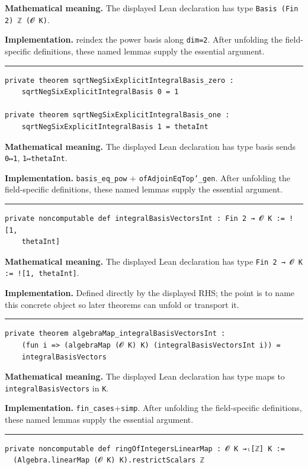 \documentclass[UTF8,a4paper,11pt,fontset=fandol]{ctexart}
\theoremstyle{definition}
\newcommand{\statementsep}{\par\medskip\hrule\medskip}
\begin{document}
\noindent\textbf{Mathematical meaning.} The displayed Lean declaration has type \texttt{Basis (Fin 2) ℤ (𝓞 K)}.\par
\noindent\textbf{Implementation.} reindex the power basis along \texttt{dim=2}. After unfolding the field-specific definitions, these named lemmas supply the essential argument.\par
\statementsep
\begin{verbatim}
private theorem sqrtNegSixExplicitIntegralBasis_zero :
    sqrtNegSixExplicitIntegralBasis 0 = 1

private theorem sqrtNegSixExplicitIntegralBasis_one :
    sqrtNegSixExplicitIntegralBasis 1 = thetaInt
\end{verbatim}
\noindent\textbf{Mathematical meaning.} The displayed Lean declaration has type basis sends \texttt{0↦1}, \texttt{1↦thetaInt}.\par
\noindent\textbf{Implementation.} \texttt{basis\_\allowbreak{}eq\_\allowbreak{}pow} + \texttt{ofAdjoinEqTop'\_\allowbreak{}gen}. After unfolding the field-specific definitions, these named lemmas supply the essential argument.\par
\statementsep
\begin{verbatim}
private noncomputable def integralBasisVectorsInt : Fin 2 → 𝓞 K := ![1,
    thetaInt]
\end{verbatim}
\noindent\textbf{Mathematical meaning.} The displayed Lean declaration has type \texttt{Fin 2 → 𝓞 K := ![1, thetaInt]}.\par
\noindent\textbf{Implementation.} Defined directly by the displayed RHS; the point is to name this concrete object so later theorems can unfold or transport it.\par
\statementsep
\begin{verbatim}
private theorem algebraMap_integralBasisVectorsInt :
    (fun i => (algebraMap (𝓞 K) K) (integralBasisVectorsInt i)) =
    integralBasisVectors
\end{verbatim}
\noindent\textbf{Mathematical meaning.} The displayed Lean declaration has type maps to \texttt{integralBasisVectors} in \texttt{K}.\par
\noindent\textbf{Implementation.} \texttt{fin\_\allowbreak{}cases}+\texttt{simp}. After unfolding the field-specific definitions, these named lemmas supply the essential argument.\par
\statementsep
\begin{verbatim}
private noncomputable def ringOfIntegersLinearMap : 𝓞 K →ₗ[ℤ] K :=
  (Algebra.linearMap (𝓞 K) K).restrictScalars ℤ
\end{verbatim}
\end{document}
